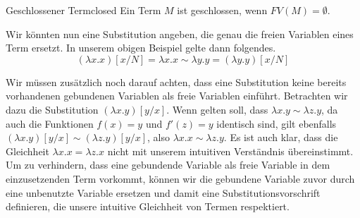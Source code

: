 \begin{definition}{Geschlossener Term}{closed}
    Ein Term $M$ ist geschlossen, wenn $FV(M)=\emptyset$.
\end{definition}

Wir könnten nun eine Substitution angeben, die genau die freien Variablen eines Term ersetzt. In unserem obigen Beispiel gelte dann folgendes.
\[(\lambda x.x)[x/N] = \lambda x.x \sim \lambda y.y = (\lambda y.y)[x/N]\]

Wir müssen zusätzlich noch darauf achten, dass eine Substitution keine bereits vorhandenen gebundenen Variablen als freie Variablen einführt. Betrachten wir dazu die Substitution \((\lambda x.y)[y/x] \). Wenn gelten soll, dass $\lambda x.y \sim \lambda z.y$, da auch die Funktionen $f(x) = y$ und $f'(z) = y$ identisch sind, gilt ebenfalls $(\lambda x.y)[y/x] \sim (\lambda z.y)[y/x]$, also $\lambda x.x\sim\lambda z.y$. 
Es ist auch klar, dass die Gleichheit $\lambda x.x = \lambda z.x$ nicht mit unserem intuitiven Verständnis übereinstimmt. Um zu verhindern, dass eine gebundende Variable als freie Variable in dem einzusetzenden Term vorkommt, können wir die gebundene Variable zuvor durch eine unbenutzte Variable ersetzen und damit eine Substitutionsvorschrift definieren, die unsere intuitive Gleichheit von Termen respektiert.

